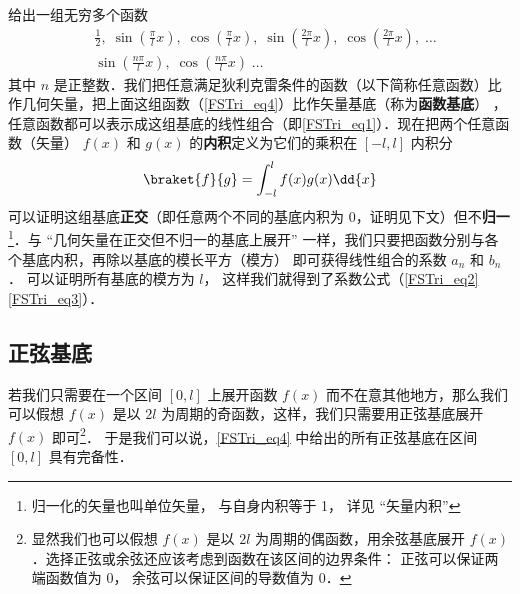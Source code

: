 % 

给出一组无穷多个函数
\begin{equation}\label{FSTri_eq4}
\begin{aligned}
&\frac12,\;   \sin(\frac{\pi}{l} x),\;   \cos(\frac{\pi}{l} x),\;   \sin(\frac{2\pi}{l} x),\;   \cos(\frac{2\pi}{l} x),\;   \dots\\
&\sin(\frac{n\pi}{l} x),\;   \cos(\frac{n\pi}{l} x)\;   \dots
\end{aligned}\end{equation}
其中 $n$ 是正整数．我们把任意满足狄利克雷条件的函数（以下简称任意函数）比作几何矢量，把上面这组函数（\autoref{FSTri_eq4}）比作矢量基底（称为\textbf{函数基底}）
，任意函数都可以表示成这组基底的线性组合（即\autoref{FSTri_eq1}）．现在把两个任意函数（矢量） $f(x)$ 和 $g(x)$ 的\textbf{内积}定义为它们的乘积在 $[-l,l]$ 内积分
\begin{equation}
\braket{f}{g} = \int_{-l}^{l} f(x)g(x) \dd{x}
\end{equation}
可以证明这组基底\textbf{正交}（即任意两个不同的基底内积为 0，证明见下文）但不\textbf{归一}\footnote{归一化的矢量也叫单位矢量， 与自身内积等于 1， 详见 “矢量内积”}．与 “几何矢量在正交但不归一的基底上展开” 一样，我们只要把函数分别与各个基底内积，再除以基底的模长平方（模方）
即可获得线性组合的系数 $a_n$ 和 $b_n$． 可以证明所有基底的模方为 $l$， 这样我们就得到了系数公式（\autoref{FSTri_eq2} \autoref{FSTri_eq3}）．


\subsection{正弦基底}
若我们只需要在一个区间 $[0,l]$ 上展开函数 $f(x)$ 而不在意其他地方，那么我们可以假想 $f(x)$ 是以 $2l$ 为周期的奇函数，这样，我们只需要用正弦基底展开 $f(x)$ 即可\footnote{显然我们也可以假想 $f(x)$ 是以 $2l$ 为周期的偶函数，用余弦基底展开 $f(x)$．选择正弦或余弦还应该考虑到函数在该区间的边界条件： 正弦可以保证两端函数值为 0， 余弦可以保证区间的导数值为 0．}． 于是我们可以说，\autoref{FSTri_eq4} 中给出的所有正弦基底在区间 $[0,l]$ 具有完备性．

